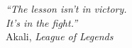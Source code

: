 \begin{flushright}
\textsl{``The lesson isn't in victory.\\
It's in the fight.''}\\
\vspace*{1.5cm}
Akali, \textit{League of Legends}
\end{flushright}